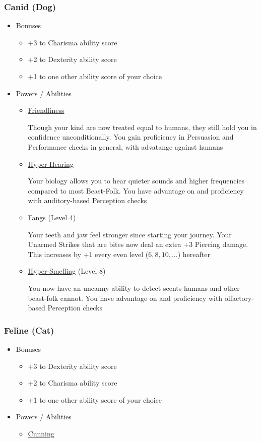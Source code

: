 \documentclass[12pt, twoside]{article}
\begin{document}
\begin{FlushLeft}
\begin{multicols}{2}
			\subsubsection{Canid (Dog)}
			\begin{itemize}[wide]
				\item Bonuses
				\begin{itemize}
					\item +3 to Charisma ability score
					\item +2 to Dexterity ability score
					\item +1 to one other ability score of your choice
				\end{itemize}
				\item Powers / Abilities
				\begin{itemize}
					\item \underline{Friendliness}

						Though your kind are now treated equal to humans, they still hold you in confidence unconditionally.
						You gain proficiency in Persuasion and Performance checks in general, with advatange against humans
					\item \underline{Hyper-Hearing}

					Your biology allows you to hear quieter sounds and higher frequencies compared to most Beast-Folk.
					You have advantage on and proficiency with auditory-based Perception checks
					\item \underline{Fangs} (Level 4)

					Your teeth and jaw feel stronger since starting your journey.
					Your Unarmed Strikes that are bites now deal an extra +3 Piercing damage. This increases by +1 every even level ($6, 8, 10, \dots$) hereafter
					\item \underline{Hyper-Smelling} (Level 8)

					You now have an uncanny ability to detect scents humans and other beast-folk cannot.
					You have advantage on and proficiency with olfactory-based Perception checks
				\end{itemize}
			\end{itemize}
			\vfill \null \columnbreak

			\subsubsection{Feline (Cat)}
			\begin{itemize}[wide]
				\item Bonuses
				\begin{itemize}
					\item +3 to Dexterity ability score
					\item +2 to Charisma ability score
					\item +1 to one other ability score of your choice
				\end{itemize}
				\item Powers / Abilities
				\begin{itemize}
					\item \underline{Cunning}


\end{itemize}
\end{itemize}
\end{multicols}
\end{FlushLeft}
\end{document}
